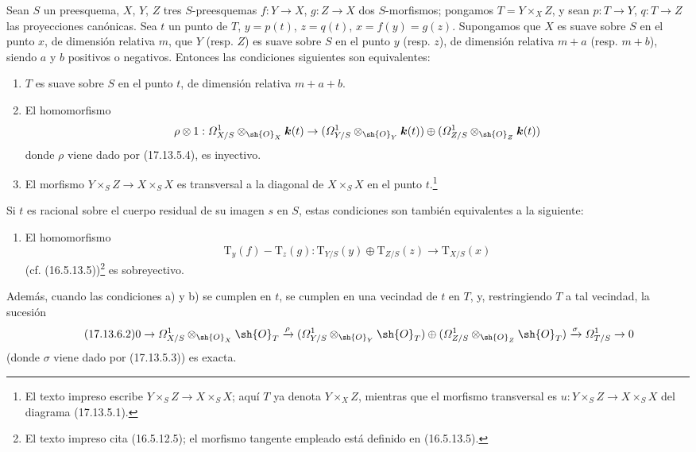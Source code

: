 \begin{corollary}[17.13.6]
\label{IV.17.13.6}
Sean $S$ un preesquema, $X$, $Y$, $Z$ tres $S$-preesquemas $f:Y\to X$, $g:Z\to X$ dos $S$-morfismos; pongamos $T=Y\times_XZ$, y sean $p:T\to Y$, $q:T\to Z$ las proyecciones canónicas. Sea $t$ un punto de $T$, $y=p(t)$, $z=q(t)$, $x=f(y)=g(z)$. Supongamos que $X$ es suave sobre $S$ en el punto $x$, de dimensión relativa $m$, que $Y$ \textup{(resp. $Z$)} es suave sobre $S$ en el punto $y$ \textup{(resp. $z$)}, de dimensión relativa $m+a$ \textup{(resp. $m+b$)}, siendo $a$ y $b$ positivos o negativos. Entonces las condiciones siguientes son equivalentes:
\begin{enumerate}
  \item[\textup{a)}] $T$ es suave sobre $S$ en el punto $t$, de dimensión relativa $m+a+b$.
  \item[\textup{b)}] El homomorfismo
  \[
  \rho\otimes1:\varOmega^1_{X/S}\otimes_{\sh{O}_X}\boldsymbol{k}(t)\to
  (\varOmega^1_{Y/S}\otimes_{\sh{O}_Y}\boldsymbol{k}(t))\oplus
  (\varOmega^1_{Z/S}\otimes_{\sh{O}_Z}\boldsymbol{k}(t))
  \]
  donde $\rho$ viene dado por \textup{(17.13.5.4)}, es inyectivo.
  \item[\textup{c)}] El morfismo $Y\times_SZ\to X\times_SX$ es transversal a la diagonal de $X\times_SX$ en el punto $t$.\footnote{El texto impreso escribe $Y\times_SZ\to X\times_SX$; aquí $T$ ya denota $Y\times_XZ$, mientras que el morfismo transversal es $u:Y\times_SZ\to X\times_SX$ del diagrama (17.13.5.1).}
\end{enumerate}
Si $t$ es racional sobre el cuerpo residual de su imagen $s$ en $S$, estas condiciones son también equivalentes a la siguiente:
\begin{enumerate}
  \item[\textup{b$'$)}] El homomorfismo
  \[
  \label{IV.17.13.6.1}
  \tag{17.13.6.1}
  \mathrm{T}_y(f)-\mathrm{T}_z(g):\mathrm{T}_{Y/S}(y)\oplus\mathrm{T}_{Z/S}(z)\to\mathrm{T}_{X/S}(x)
  \]
  \textup{(cf. (16.5.13.5))}\footnote{El texto impreso cita (16.5.12.5); el morfismo tangente empleado está definido en (16.5.13.5).} es sobreyectivo.
\end{enumerate}
Además, cuando las condiciones \textup{a)} y \textup{b)} se cumplen en $t$, se cumplen en una vecindad de $t$ en $T$, y, restringiendo $T$ a tal vecindad, la sucesión
\[
\label{IV.17.13.6.2}
\tag{17.13.6.2}
0\to\varOmega^1_{X/S}\otimes_{\sh{O}_X}\sh{O}_T\xrightarrow{\rho}
(\varOmega^1_{Y/S}\otimes_{\sh{O}_Y}\sh{O}_T)\oplus
(\varOmega^1_{Z/S}\otimes_{\sh{O}_Z}\sh{O}_T)
\xrightarrow{\sigma}\varOmega^1_{T/S}\to0
\]
\textup{(}donde $\sigma$ viene dado por \textup{(17.13.5.3))} es exacta.
\end{corollary}

